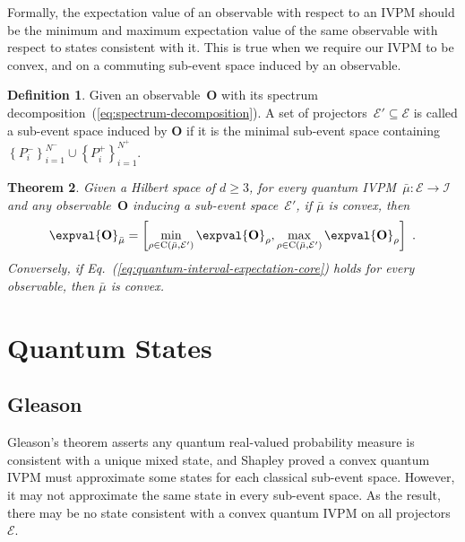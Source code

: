 \documentclass[english,reprint, aps, prl,superscriptaddress, showpacs,
showkeys, longbibliography, amsmath, amssymb]{revtex4-1}
\theoremstyle{plain}
\newtheorem{thm}{Theorem}
\theoremstyle{definition}
\newtheorem{definition}[thm]{Definition}
\newcommand{\events}{\ensuremath{\mathcal{E}}}
\newcommand{\coreBorn}{\ensuremath{\mathrm{C}}}
\begin{document}
Formally, the expectation value of an observable with respect to an
IVPM should be the minimum and maximum expectation value of the same
observable with respect to states consistent with it. This is true
when we require our IVPM to be convex, and on a commuting sub-event
space induced by an observable.

\begin{definition}Given an observable~$\mathbf{O}$ with its spectrum
decomposition~(\ref{eq:spectrum-decomposition}). A set of projectors~$\events'\subseteq\events$
is called a sub-event space induced by $\mathbf{O}$ if it is the
minimal sub-event space containing $\left\{ P_{i}^{-}\right\} _{i=1}^{N^{-}}\cup\left\{ P_{i}^{+}\right\} _{i=1}^{N^{+}}$.\end{definition}

\begin{thm}Given a Hilbert space of $d\ge3$, for every quantum IVPM~$\bar{\mu}:\events\rightarrow\mathscr{I}$
and any observable~$\mathbf{O}$ inducing a sub-event space~$\events'$,
if $\bar{\mu}$ is convex, then
\begin{equation}
\expval{\mathbf{O}}_{\bar{\mu}}=\left[\min_{\rho\in\coreBorn\left(\bar{\mu},\events'\right)}\expval{\mathbf{O}}_{\rho},\max_{\rho\in\coreBorn\left(\bar{\mu},\events'\right)}\expval{\mathbf{O}}_{\rho}\right]\textrm{ .}\label{eq:quantum-interval-expectation-core}
\end{equation}
Conversely, if Eq.~(\ref{eq:quantum-interval-expectation-core})
holds for every observable, then $\bar{\mu}$ is convex.\end{thm}

\section{Quantum States} 

\subsection{Gleason}

Gleason's theorem asserts any quantum real-valued probability measure
is consistent with a unique mixed state, and Shapley proved a convex
quantum IVPM must approximate some states for each classical sub-event
space. However, it may not approximate the same state in every sub-event
space. As the result, there may be no state consistent with a convex
quantum IVPM on all projectors~$\events$.
\end{document}
